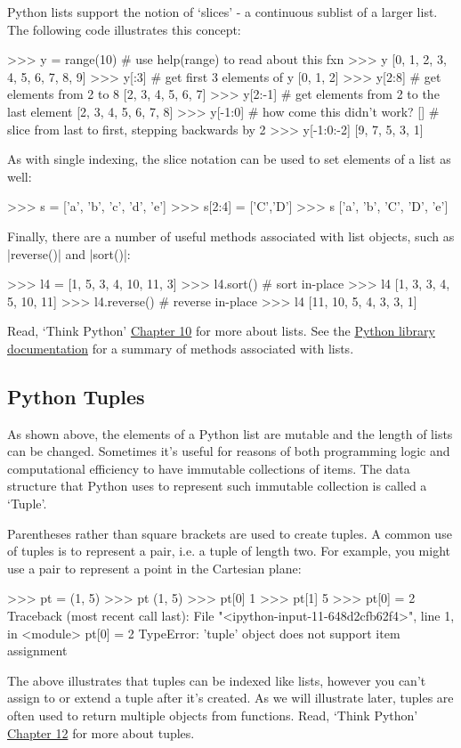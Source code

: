 Python lists support the notion of `slices' - a continuous sublist of a
larger list. The following code illustrates this concept:
%
\begin{python}
>>> y = range(10)  # use help(range) to read about this fxn
>>> y
[0, 1, 2, 3, 4, 5, 6, 7, 8, 9]
>>> y[:3]  # get first 3 elements of y
[0, 1, 2]
>>> y[2:8] # get elements from 2 to 8
[2, 3, 4, 5, 6, 7]
>>> y[2:-1] # get elements from 2 to the last element
[2, 3, 4, 5, 6, 7, 8]
>>> y[-1:0] # how come this didn't work? 
[]
# slice from last to first, stepping backwards by 2
>>> y[-1:0:-2]  
[9, 7, 5, 3, 1]
\end{python}
%
As with single indexing, the slice notation can be used to set elements of a list as well:
\begin{python}
>>> s = ['a', 'b', 'c', 'd', 'e']
>>> s[2:4] = ['C','D']
>>> s
['a', 'b', 'C', 'D', 'e']
\end{python}
%
Finally, there are a number of useful methods associated with list objects, such as |reverse()| and |sort()|:
\begin{python}
>>> l4 = [1, 5, 3, 4, 10, 11, 3]
>>> l4.sort() # sort in-place
>>> l4
[1, 3, 3, 4, 5, 10, 11]
>>> l4.reverse() # reverse in-place
>>> l4
[11, 10, 5, 4, 3, 3, 1]
\end{python}

Read, `Think Python' \href{http://www.greenteapress.com/thinkpython/html/thinkpython011.html}{Chapter 10} for more about lists.  See the \href{http://docs.python.org/2.7/library/stdtypes.html#sequence-types-str-unicode-list-tuple-bytearray-buffer-xrange}{Python library documentation} for a summary of methods associated with lists.


\subsection{Python Tuples}

As shown above, the elements of a Python list are mutable and the length of lists can be changed.  Sometimes it's useful for reasons of both programming logic and computational efficiency to have immutable collections of items.  The data structure that Python uses to represent such immutable collection is called a `Tuple'.

Parentheses rather than square brackets are used to create tuples.  A common use of tuples is to represent a pair, i.e. a tuple of length two.  For example, you might use a pair to represent a point in the Cartesian plane:
%
\begin{python}
>>> pt = (1, 5)
>>> pt
(1, 5)
>>> pt[0]
1
>>> pt[1]
5
>>> pt[0] = 2
Traceback (most recent call last):
  File "<ipython-input-11-648d2cfb62f4>", line 1, in <module>
    pt[0] = 2
TypeError: 'tuple' object does not support item assignment
\end{python}
%
The above illustrates that tuples can be indexed like lists, however you can't assign to or extend a tuple after it's created. As we will illustrate later, tuples are often used to return multiple objects from functions. Read, `Think Python' \href{http://www.greenteapress.com/thinkpython/html/thinkpython013.html}{Chapter 12} for more about tuples.



